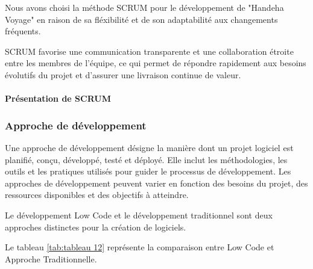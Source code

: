 \documentclass[12pt]{report}
\begin{document}
				Nous avons choisi la méthode SCRUM pour le développement de "Handeha Voyage" en raison de sa fléxibilité et de son adaptabilité aux changements fréquents.

				SCRUM favorise une communication transparente et une collaboration étroite entre les membres de l'équipe, ce qui permet de répondre rapidement aux besoins évolutifs du projet et d'assurer une livraison continue de valeur.

				\paragraph{Présentation de SCRUM}

				
				\subsubsection{Approche de développement}
				
				\hspace{15pt} Une approche de développement désigne la manière dont un projet logiciel est planifié, conçu, développé, testé et déployé. Elle inclut les méthodologies, les outils et les pratiques
utilisés pour guider le processus de développement. Les approches de développement peuvent varier en fonction des besoins du projet, des ressources disponibles et des objectifs à atteindre.

				Le développement Low Code et le développement traditionnel sont deux approches distinctes pour la création de logiciels.

				Le tableau \ref{tab:tableau 12} représente la comparaison entre Low Code et Approche Traditionnelle.
\end{document}
